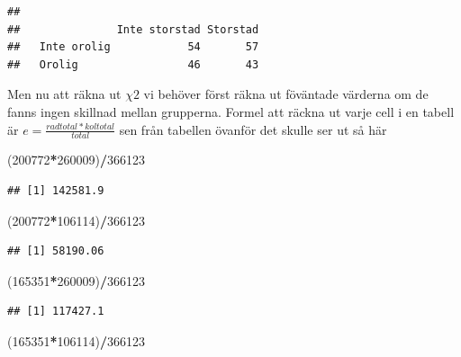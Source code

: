 \documentclass[
]{book}
\newenvironment{Shaded}{\begin{snugshade}}{\end{snugshade}}
\newcommand{\DecValTok}[1]{\textcolor[rgb]{0.00,0.00,0.81}{#1}}
\newcommand{\NormalTok}[1]{#1}
\newcommand{\SpecialCharTok}[1]{\textcolor[rgb]{0.81,0.36,0.00}{\textbf{#1}}}
\begin{document}
\begin{verbatim}
##              
##               Inte storstad Storstad
##   Inte orolig            54       57
##   Orolig                 46       43
\end{verbatim}

Men nu att räkna ut \(\chi {2}\) vi behöver först räkna ut föväntade värderna om de fanns ingen skillnad mellan grupperna. Formel att räckna ut varje cell i en tabell är \({e}= \frac{radtotal \ast koltotal}{total}\) sen från tabellen övanför det skulle ser ut så här

\begin{Shaded}
\begin{Highlighting}[]
\NormalTok{(}\DecValTok{200772}\SpecialCharTok{*}\DecValTok{260009}\NormalTok{)}\SpecialCharTok{/}\DecValTok{366123}
\end{Highlighting}
\end{Shaded}

\begin{verbatim}
## [1] 142581.9
\end{verbatim}

\begin{Shaded}
\begin{Highlighting}[]
\NormalTok{(}\DecValTok{200772}\SpecialCharTok{*}\DecValTok{106114}\NormalTok{)}\SpecialCharTok{/}\DecValTok{366123}
\end{Highlighting}
\end{Shaded}

\begin{verbatim}
## [1] 58190.06
\end{verbatim}

\begin{Shaded}
\begin{Highlighting}[]
\NormalTok{(}\DecValTok{165351}\SpecialCharTok{*}\DecValTok{260009}\NormalTok{)}\SpecialCharTok{/}\DecValTok{366123}
\end{Highlighting}
\end{Shaded}

\begin{verbatim}
## [1] 117427.1
\end{verbatim}

\begin{Shaded}
\begin{Highlighting}[]
\NormalTok{(}\DecValTok{165351}\SpecialCharTok{*}\DecValTok{106114}\NormalTok{)}\SpecialCharTok{/}\DecValTok{366123}
\end{Highlighting}
\end{Shaded}
\end{document}
